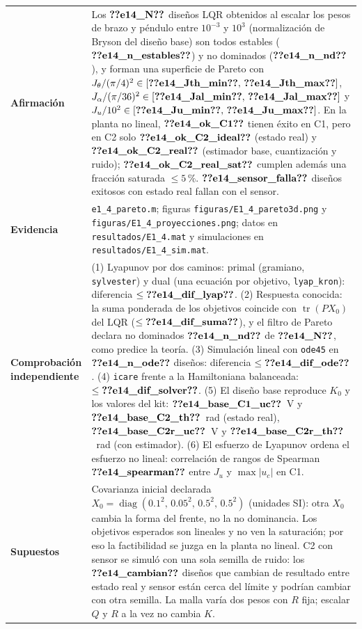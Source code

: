 \begin{recuadro}[title=Ficha de evidencia — E1.4: frente de Pareto]
\begin{tabularx}{\linewidth}{@{}>{\bfseries}p{3.1cm} >{\raggedright\arraybackslash}X@{}}
Afirmación &
Los $\V{e14_N}$ diseños LQR obtenidos al escalar los pesos de brazo y péndulo entre $10^{-3}$ y $10^{3}$
(normalización de Bryson del diseño base) son todos estables ($\V{e14_n_estables}$) y no dominados
($\V{e14_n_nd}$), y forman una superficie de Pareto con
$J_\theta/(\pi/4)^2\in[\V{e14_Jth_min},\,\V{e14_Jth_max}]$, $J_\alpha/(\pi/36)^2\in[\V{e14_Jal_min},\,\V{e14_Jal_max}]$ y
$J_u/10^2\in[\V{e14_Ju_min},\,\V{e14_Ju_max}]$. En la planta no lineal, $\V{e14_ok_C1}$ tienen éxito en C1, pero en
C2 solo $\V{e14_ok_C2_ideal}$ (estado real) y $\V{e14_ok_C2_real}$ (estimador base, cuantización y ruido);
$\V{e14_ok_C2_real_sat}$ cumplen además una fracción saturada $\le5\,\%$. $\V{e14_sensor_falla}$ diseños exitosos con
estado real fallan con el sensor. \\[3pt]
Evidencia &
\texttt{e1\_4\_pareto.m}; figuras \texttt{figuras/E1\_4\_pareto3d.png} y \texttt{figuras/E1\_4\_proyecciones.png};
datos en \texttt{resultados/E1\_4.mat} y simulaciones en \texttt{resultados/E1\_4\_sim.mat}. \\[3pt]
Comprobación independiente &
(1) Lyapunov por dos caminos: primal (gramiano, \texttt{sylvester}) y dual (una ecuación por objetivo,
\texttt{lyap\_kron}): diferencia $\le\V{e14_dif_lyap}$.
(2) Respuesta conocida: la suma ponderada de los objetivos coincide con $\operatorname{tr}(PX_0)$ del LQR
($\le\V{e14_dif_suma}$), y el filtro de Pareto declara no dominados $\V{e14_n_nd}$ de $\V{e14_N}$, como predice la teoría.
(3) Simulación lineal con \texttt{ode45} en $\V{e14_n_ode}$ diseños: diferencia $\le\V{e14_dif_ode}$.
(4) \texttt{icare} frente a la Hamiltoniana balanceada: $\le\V{e14_dif_solver}$.
(5) El diseño base reproduce $K_0$ y los valores del kit: $\V{e14_base_C1_uc}$~V y $\V{e14_base_C2_th}$~rad (estado real),
$\V{e14_base_C2r_uc}$~V y $\V{e14_base_C2r_th}$~rad (con estimador).
(6) El esfuerzo de Lyapunov ordena el esfuerzo no lineal: correlación de rangos de Spearman $\V{e14_spearman}$ entre
$J_u$ y $\max|u_c|$ en C1. \\[3pt]
Supuestos &
Covarianza inicial declarada $X_0=\operatorname{diag}(0.1^2,\,0.05^2,\,0.5^2,\,0.5^2)$ (unidades SI): otra $X_0$
cambia la forma del frente, no la no dominancia. Los objetivos esperados son lineales y no ven la
saturación; por eso la factibilidad se juzga en la planta no lineal. C2 con sensor se simuló con una sola
semilla de ruido: los $\V{e14_cambian}$ diseños que cambian de resultado entre estado real y sensor están cerca del
límite y podrían cambiar con otra semilla. La malla varía dos pesos con $R$ fija; escalar $Q$ y $R$ a la vez no
cambia $K$.
\end{tabularx}
\end{recuadro}

